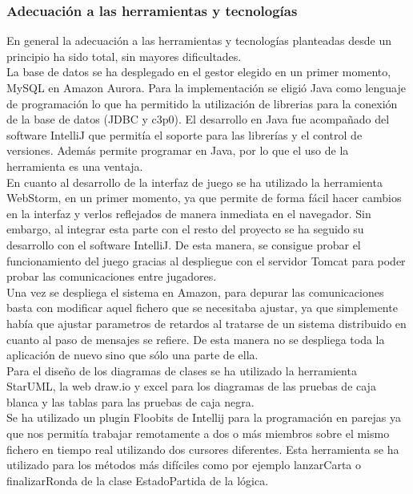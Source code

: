 \subsubsection{Adecuación a las herramientas y tecnologías}
En general la adecuación a las herramientas y tecnologías planteadas desde un principio ha sido total, sin mayores dificultades. \\
La base de datos se ha desplegado en el gestor elegido en un primer momento, MySQL en Amazon Aurora. Para la implementación se eligió Java como lenguaje de programación lo que ha permitido la utilización de librerias para la conexión de la base de datos (JDBC y c3p0). El desarrollo en Java fue acompañado del software IntelliJ que permitía el soporte para las librerías y el control de versiones. Además permite programar en Java, por lo que el uso de la herramienta es una ventaja.
\\
En cuanto al desarrollo de la interfaz de juego se ha utilizado la herramienta WebStorm, en un primer momento, ya que permite de forma fácil hacer cambios en la interfaz y verlos reflejados de manera inmediata en el navegador. Sin embargo, al integrar esta parte con el resto del proyecto se ha seguido su desarrollo con el software IntelliJ. De esta manera, se consigue probar el funcionamiento del juego gracias al despliegue con el servidor Tomcat para poder probar las comunicaciones entre jugadores.
\\
Una vez se despliega el sistema en Amazon, para depurar las comunicaciones basta con modificar aquel fichero que se necesitaba ajustar, ya que simplemente había que ajustar parametros de retardos al tratarse de un sistema distribuido en cuanto al paso de mensajes se refiere. De esta manera no se despliega toda la aplicación de nuevo sino que sólo una parte de ella.
\\
Para el diseño de los diagramas de clases se ha utilizado la herramienta StarUML, la web draw.io y excel para los diagramas de las pruebas de caja blanca y las tablas para las pruebas de caja negra.
\\
Se ha utilizado un plugin Floobits de Intellij para la programación en parejas ya que nos permitía trabajar remotamente a dos o más miembros sobre el mismo fichero en tiempo real utilizando dos cursores diferentes. Esta herramienta se ha utilizado para los métodos más difíciles como por ejemplo lanzarCarta o finalizarRonda de la clase EstadoPartida de la lógica.
\\


